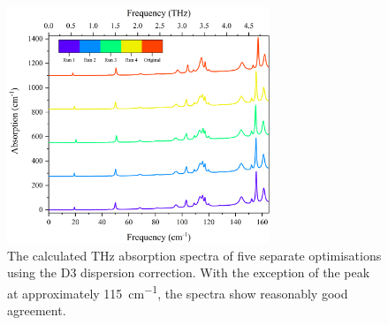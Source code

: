 \begin{figure}[h]
    \centering
    \includegraphics[width=0.7\textwidth]{Figures/Spectra/Sim Study/SimStudG.png}
    \captionsetup{font = footnotesize, justification = centering}
    \caption[The Calculated Terahertz Absorption Spectra of five Optimisations using the D3 Dispersion Correction]{The calculated THz absorption spectra of five separate optimisations using the D3 dispersion correction. With the exception of the peak at approximately \SI{115}{cm^{-1}}, the spectra show reasonably good agreement.}
    \label{fig:simstudy1}
\end{figure}

